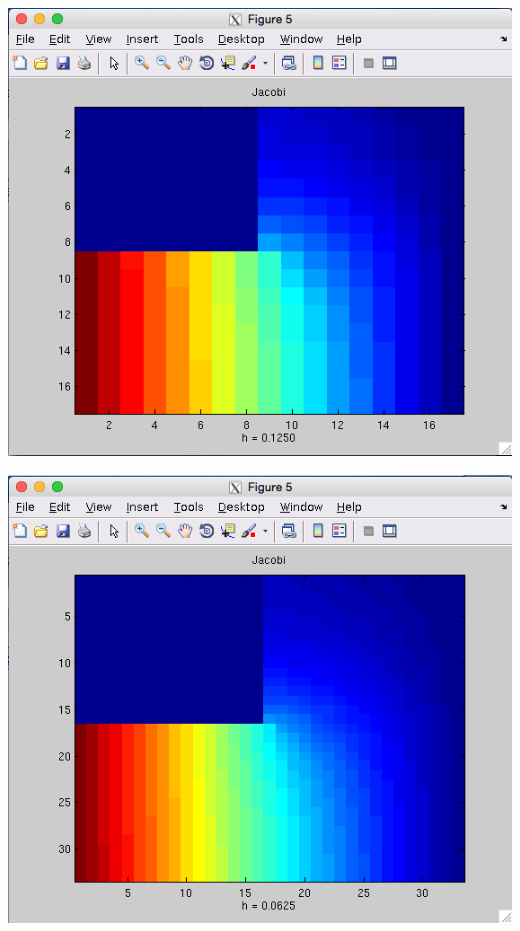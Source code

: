 \documentclass[11pt, oneside]{article}   	%
\begin{document}
\centerline{\includegraphics[scale = 0.55]{Jacobi_h3.png}}

\centerline{\includegraphics[scale = 0.55]{Jacobi_h4.png}}
\end{document}
